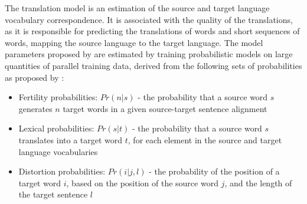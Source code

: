 

The translation model is an estimation of the source and target language vocabulary correspondence. It is associated with the quality of the translations, as it is responsible for predicting the translations of words and short sequences of words, mapping the source language to the target language. The model parameters proposed by are estimated by training probabilistic models on large quantities of parallel training data, derived from the following sets of probabilities as proposed by \cite{brown_statistical_1990}:
\begin{itemize}
    \item Fertility probabilities:  $Pr(n|s)$ - the probability that a source word $s$ generates $n$ target words in a given source-target sentence alignment
    
    \item Lexical probabilities: $Pr(s|t)$ - the probability that a source word $s$ translates into a target word $t$, for each element in the source and target language vocabularies
    
    \item Distortion probabilities: $Pr(i|j, l)$ - the probability of the position of a target word $i$, based on the position of the source word $j$, and the length of the target sentence $l$
    
    
\end{itemize}


